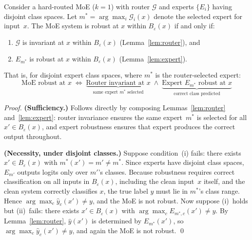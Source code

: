 \documentclass[runningheads]{llncs}
\begin{document}
\begin{theorem}
\label{thm:compositional}
Consider a hard-routed MoE ($k{=}1$) with router $\mathcal{G}$ and experts $\{E_i\}$ having disjoint class spaces. Let $m^* = \arg\max_i \mathcal{G}_i(x)$ denote the selected expert for input~$x$. The MoE system is robust at $x$ within $B_\varepsilon(x)$ if and only if:
\begin{enumerate}
    \item[(i)] $\mathcal{G}$ is invariant at $x$ within $B_\varepsilon(x)$ (Lemma~\ref{lem:router}), and
    \item[(ii)] $E_{m^*}$ is robust at $x$ within $B_\varepsilon(x)$ (Lemma~\ref{lem:expert}).
\end{enumerate}
That is, for disjoint expert class spaces, where $m^*$ is the router-selected expert:
\begin{equation}
    \text{MoE robust at } x \;\Longleftrightarrow\; \underbrace{\text{Router invariant at } x}_{\text{same expert } m^* \text{ selected}} \;\land\; \underbrace{\text{Expert } E_{m^*} \text{ robust at } x}_{\text{correct class predicted}}
\end{equation}
\end{theorem}

\begin{proof}
\textbf{(Sufficiency.)} Follows directly by composing Lemmas~\ref{lem:router} and~\ref{lem:expert}: router invariance ensures the same expert~$m^*$ is selected for all $x' \in B_\varepsilon(x)$, and expert robustness ensures that expert produces the correct output throughout.

\textbf{(Necessity, under disjoint classes.)} Suppose condition~(i) fails: there exists $x' \in B_\varepsilon(x)$ with $m^*(x') = m' \neq m^*$. Since experts have disjoint class spaces, $E_{m'}$ outputs logits only over $m'$'s classes. Because robustness requires correct classification on all inputs in $B_\varepsilon(x)$, including the clean input~$x$ itself, and the clean system correctly classifies $x$, the true label $y$ must lie in $m^*$'s class range. Hence $\arg\max_c \hat{y}_c(x') \neq y$, and the MoE is not robust. Now suppose (i)~holds but (ii)~fails: there exists $x' \in B_\varepsilon(x)$ with $\arg\max_c E_{m^*,c}(x') \neq y$. By Lemma~\ref{lem:router}, $\hat{y}(x')$ is determined by $E_{m^*}(x')$, so $\arg\max_c \hat{y}_c(x') \neq y$, and again the MoE is not robust. \qed
\end{proof}
\end{document}
